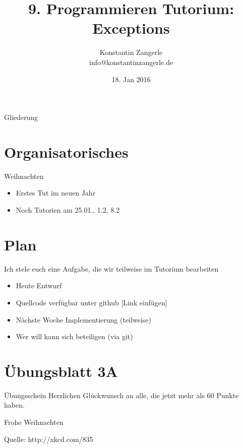 \documentclass[18pt]{beamer}
\title[Programmieren Tutorium]{9. Programmieren Tutorium:\texorpdfstring{\\}{} Exceptions}
\author{Konstantin Zangerle \texorpdfstring{\\}{} info@konstantinzangerle.de}
\date{18. Jan 2016}
\begin{document}

\begin{frame}
\titlepage
\end{frame}

\begin{frame}{Gliederung}
\tableofcontents
\end{frame}

\section{Organisatorisches}

\begin{frame}{Weihnachten}
 \begin{itemize}
  \item Erstes Tut im neuen Jahr
  \item Noch Tutorien am 25.01., 1.2, 8.2
 \end{itemize}

\end{frame}

\section{Plan}
Ich stele euch eine Aufgabe, die wir teilweise im Tutorium bearbeiten
\begin{itemize}
 \item Heute Entwurf
 \item Quellcode verfügbar unter github [Link einfügen] \item Nächste Woche Implementierung (teilweise)
 \item Wer will kann sich beteiligen (via git)
\end{itemize}



\section{Übungsblatt 3A}
\begin{frame}{Übungsschein}
  \large
  Herzlichen Glückwunsch an alle, die jetzt mehr als 60 Punkte haben.
\end{frame}



\begin{frame}{Frohe Weihnachten}
 
 Quelle: http://xkcd.com/835
\end{frame}
\end{document}
